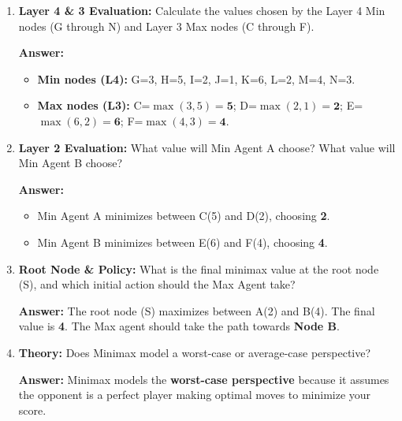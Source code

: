 \documentclass[11pt, letterpaper]{article}
\begin{document}
\begin{enumerate}
    \item \textbf{Layer 4 \& 3 Evaluation:} Calculate the values chosen by the Layer 4 Min nodes (G through N) and Layer 3 Max nodes (C through F).\\
    \begin{tcolorbox}[colback=gray!10, colframe=gray!50, title=Solution]
    \textbf{Answer:} 
    \begin{itemize}
        \item \textbf{Min nodes (L4):} G=3, H=5, I=2, J=1, K=6, L=2, M=4, N=3.
        \item \textbf{Max nodes (L3):} 
        C=$\max(3,5)=\textbf{5}$; 
        D=$\max(2,1)=\textbf{2}$; 
        E=$\max(6,2)=\textbf{6}$; 
        F=$\max(4,3)=\textbf{4}$.
    \end{itemize}
    \end{tcolorbox}

    \item \textbf{Layer 2 Evaluation:} What value will Min Agent A choose? What value will Min Agent B choose?\\
    \begin{tcolorbox}[colback=gray!10, colframe=gray!50, title=Solution]
    \textbf{Answer:} 
    \begin{itemize}
        \item Min Agent A minimizes between C(5) and D(2), choosing \textbf{2}.
        \item Min Agent B minimizes between E(6) and F(4), choosing \textbf{4}.
    \end{itemize}
    \end{tcolorbox}

    \item \textbf{Root Node \& Policy:} What is the final minimax value at the root node (S), and which initial action should the Max Agent take?\\
    \begin{tcolorbox}[colback=gray!10, colframe=gray!50, title=Solution]
    \textbf{Answer:} The root node (S) maximizes between A(2) and B(4). The final value is \textbf{4}. The Max agent should take the path towards \textbf{Node B}.
    \end{tcolorbox}

    \item \textbf{Theory:} Does Minimax model a worst-case or average-case perspective?\\
    \begin{tcolorbox}[colback=gray!10, colframe=gray!50, title=Solution]
    \textbf{Answer:} Minimax models the \textbf{worst-case perspective} because it assumes the opponent is a perfect player making optimal moves to minimize your score.
    \end{tcolorbox}
\end{enumerate}
\end{document}
